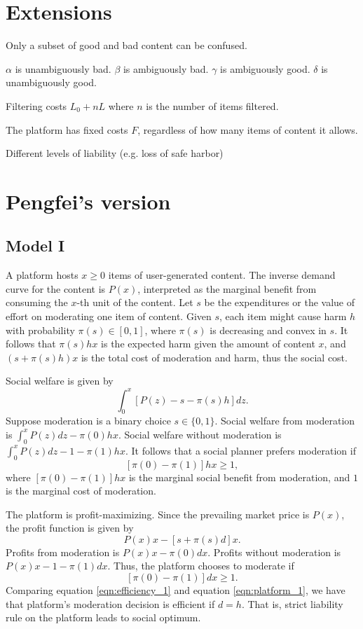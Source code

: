 \documentclass[openbib,12pt]{article}  %
\newcommand{\gs}{\geqslant}
\begin{document}
\section{Extensions}

Only a subset of good and bad content can be confused.

$\alpha$ is unambiguously bad.
$\beta$ is ambiguously bad.
$\gamma$ is ambiguously good.
$\delta$ is unambiguously good.

Filtering costs $L_0 + nL$ where $n$ is the number of items filtered.

The platform has fixed costs $F$, regardless of how many items of content it allows.

Different levels of liability (e.g. loss of safe harbor)

\section{Pengfei's version}

\subsection{Model I}
A platform hosts $x\gs 0$ items of user-generated content. 
The inverse demand curve for the content is $P(x)$, interpreted as the marginal benefit from consuming the $x$-th unit of the content. 
Let $s$ be the expenditures or the value of effort on moderating one item of content.
Given $s$, each item might cause harm $h$ with probability $\pi(s)\in[0,1]$, where $\pi(s)$ is decreasing and convex in $s$. It follows that $\pi(s)hx$ is the expected harm given the amount of content $x$, and $(s+\pi(s)h)x$ is the total cost of moderation and harm, thus the social cost.

Social welfare is given by 
\begin{equation}
    \int_0^x [P(z)-s-\pi(s)h]dz.
\end{equation}
Suppose moderation is a binary choice $s\in\{0,1\}$. Social welfare from moderation is $\int_0^x P(z)dz-\pi(0)hx$. Social welfare without moderation is $\int_0^x P(z)dz-1-\pi(1)hx$. It follows that a social planner prefers moderation if 
\begin{equation}\label{eqn:efficiency_1}
    [\pi(0)-\pi(1)]hx\gs 1,
\end{equation}
where $[\pi(0)-\pi(1)]hx$ is the marginal social benefit from moderation, and $1$ is the marginal cost of moderation. 

The platform is profit-maximizing. Since the prevailing market price is $P(x)$, the profit function is given by 
\begin{equation}
    P(x)x-[s+\pi(s)d]x.
\end{equation}
Profits from moderation is $P(x)x-\pi(0)dx$. Profits without moderation is $P(x)x-1-\pi(1)dx$. Thus, the platform chooses to moderate if 
\begin{equation}\label{eqn:platform_1}
    [\pi(0)-\pi(1)]dx\gs 1.
\end{equation}
Comparing equation \ref{eqn:efficiency_1} and equation \ref{eqn:platform_1}, we have that platform's moderation decision is efficient if $d=h$. That is, strict liability rule on the platform leads to social optimum. 
\end{document}
